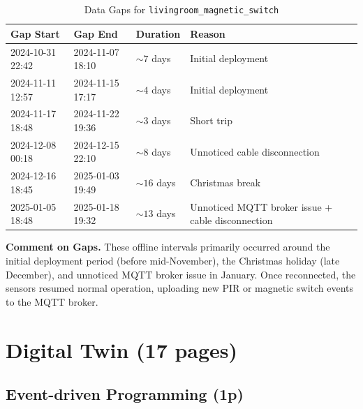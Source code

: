 \documentclass[A4,10pt]{article}
\begin{document}
\begin{itemize}
	\begin{table}[ht!]
	\centering
	\caption{Data Gaps for \texttt{livingroom\_magnetic\_switch}}
	\label{tab:magnetic_gaps}
	\begin{tabular}{llll}
	\hline
	\textbf{Gap Start}      & \textbf{Gap End}        & \textbf{Duration} & \textbf{Reason}             \\
	\hline
	2024-10-31 22:42        & 2024-11-07 18:10        & $\sim7$ days      & Initial deployment          \\
	2024-11-11 12:57        & 2024-11-15 17:17        & $\sim4$ days      & Initial deployment          \\
	2024-11-17 18:48        & 2024-11-22 19:36        & $\sim3$ days      & Short trip                  \\
	2024-12-08 00:18        & 2024-12-15 22:10        & $\sim8$ days      & Unnoticed cable disconnection         \\
	2024-12-16 18:45        & 2025-01-03 19:49        & $\sim16$ days     & Christmas break             \\
	2025-01-05 18:48        & 2025-01-18 19:32        & $\sim13$ days     & Unnoticed MQTT broker issue + cable disconnection \\
	\hline
	\end{tabular}
	\end{table}
	
	\noindent
	\textbf{Comment on Gaps.} 
	These offline intervals primarily occurred around the initial deployment period (before mid-November), the Christmas holiday (late December), and unnoticed MQTT broker issue in January. Once reconnected, the sensors resumed normal operation, uploading new PIR or magnetic switch events to the MQTT broker.
	
\end{itemize}

\pagebreak
\section{Digital Twin (17 pages)}

\subsection{Event-driven Programming (1p)}
\end{document}
